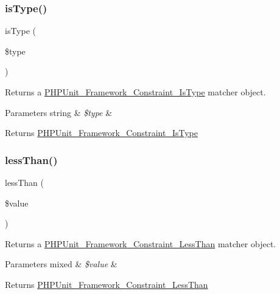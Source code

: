 \subsubsection{\texorpdfstring{is\+Type()}{isType()}}
{\footnotesize\ttfamily is\+Type (\begin{DoxyParamCaption}\item[{}]{\$type }\end{DoxyParamCaption})}

Returns a \mbox{\hyperlink{class_p_h_p_unit___framework___constraint___is_type}{P\+H\+P\+Unit\+\_\+\+Framework\+\_\+\+Constraint\+\_\+\+Is\+Type}} matcher object.


\begin{DoxyParams}[1]{Parameters}
string & {\em \$type} & \\
\hline
\end{DoxyParams}
\begin{DoxyReturn}{Returns}
\mbox{\hyperlink{class_p_h_p_unit___framework___constraint___is_type}{P\+H\+P\+Unit\+\_\+\+Framework\+\_\+\+Constraint\+\_\+\+Is\+Type}} 
\end{DoxyReturn}
\mbox{\label{_functions_8php_a6129cde2908aad852772b7b5ac5e1191}} 
\subsubsection{\texorpdfstring{less\+Than()}{lessThan()}}
{\footnotesize\ttfamily less\+Than (\begin{DoxyParamCaption}\item[{}]{\$value }\end{DoxyParamCaption})}

Returns a \mbox{\hyperlink{class_p_h_p_unit___framework___constraint___less_than}{P\+H\+P\+Unit\+\_\+\+Framework\+\_\+\+Constraint\+\_\+\+Less\+Than}} matcher object.


\begin{DoxyParams}[1]{Parameters}
mixed & {\em \$value} & \\
\hline
\end{DoxyParams}
\begin{DoxyReturn}{Returns}
\mbox{\hyperlink{class_p_h_p_unit___framework___constraint___less_than}{P\+H\+P\+Unit\+\_\+\+Framework\+\_\+\+Constraint\+\_\+\+Less\+Than}} 
\end{DoxyReturn}
\mbox{\label{_functions_8php_ab1eb2e4bdbacc1ced86eb0c4cf7c266a}} 
